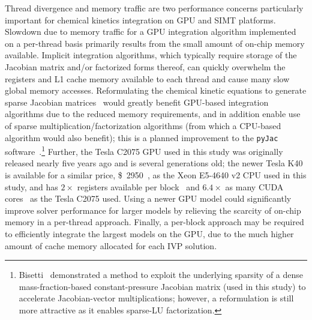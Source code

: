 \documentclass[preprint,review,11pt]{elsarticle}
\begin{document}
Thread divergence and memory traffic are two performance concerns particularly important for chemical kinetics integration on GPU and SIMT platforms.
Slowdown due to memory traffic for a GPU integration algorithm implemented on a per-thread basis primarily results from the small amount of on-chip memory available.
Implicit integration algorithms, which typically require storage of the Jacobian matrix and\slash or factorized forms thereof, can quickly overwhelm the registers and L1 cache memory available to each thread and cause many slow global memory accesses.
Reformulating the chemical kinetic equations to generate sparse Jacobian matrices~\cite{Schwer2002270} would greatly benefit GPU-based integration algorithms due to the reduced memory requirements, and in addition enable use of sparse multiplication\slash factorization algorithms (from which a CPU-based algorithm would also benefit); this is a planned improvement to the \texttt{pyJac} software~\cite{Niemeyer:2016aa,niemeyer_2016_51139}.\footnote{Bisetti~\cite{Bisetti:2012jw} demonstrated a method to exploit the underlying sparsity of a dense mass-fraction-based constant-pressure Jacobian matrix (used in this study) to accelerate Jacobian-vector multiplications; however, a reformulation is still more attractive as it enables sparse-LU factorization.}
Further, the Tesla C2075 GPU used in this study was originally released nearly five years ago and is several generations old; the newer Tesla K40 is available for a similar price, \SI{2950}[\$]{}~\cite{k40_price}, as the Xeon E5-4640 v2 CPU used in this study, and has $2\times$ registers available per block~\cite{NVIDIA:2015aa} and $6.4\times$ as many CUDA cores~\cite{k40_specs} as the Tesla C2075 used.
Using a newer GPU model could significantly improve solver performance for larger models by relieving the scarcity of on-chip memory in a per-thread approach.
Finally, a per-block approach may be required to efficiently integrate the largest models on the GPU, due to the much higher amount of cache memory allocated for each IVP solution.
\end{document}
